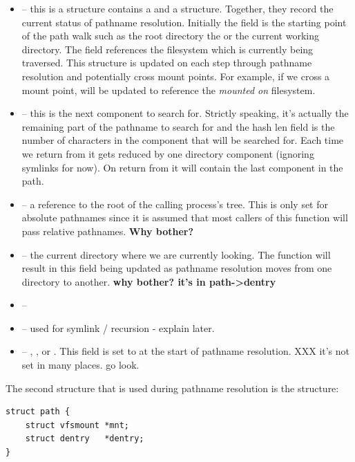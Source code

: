 \begin{itemize}
	\item {} -- this is a  structure contains a  and a  structure. Together, they record the 
		current status of pathname resolution. Initially the  field is the starting point of the path walk 
		such as the root directory the or the current working directory. The  field references the filesystem which
		is currently being traversed. This structure is updated on each step through pathname resolution and potentially cross
		mount points. For example, if we cross a mount point,  will be updated to reference the \textit{mounted on}
		filesystem.
	\item {} -- this is the next component to search for. Strictly speaking, it's actually the remaining part of the
		pathname to search for and the hash len field is the number of characters in the component that will be searched 
		for. Each time we return from  it gets reduced by one directory component (ignoring 
		symlinks for now). On return from  it will contain the last component in the path.
	\item {} -- a reference to the root of the calling process's tree. This is only set for absolute pathnames since it
		is assumed that most callers of this function will pass relative pathnames. \textbf{Why bother?}
	\item {} -- the current directory where we are currently looking. The  function will result in this 
		field being updated as pathname resolution moves from one directory to another. \textbf{why bother? it's in path->dentry}
	\item {} -- 
	\item {} -- used for symlink / recursion - explain later.
	\item {} -- , ,  or . This field is
		set to  at the start of pathname resolution.  XXX it's not set in many places. go look.
\end{itemize}

\noindent
The second structure that is used during pathname resolution is the  structure:

\begin{lstlisting}
struct path {
    struct vfsmount *mnt;
    struct dentry   *dentry;
}
\end{lstlisting}

